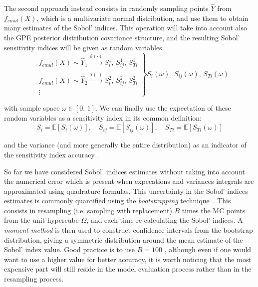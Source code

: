 \noindent
The second approach instead consists in randomly sampling points $\hat{Y}$ from $f_{emul}(X)$, which is a multivariate normal distribution, and use them to obtain many estimates of the Sobol' indices. This operation will take into account also the GPE posterior distribution covariance structure, and the resulting Sobol' sensitivity indices will be given as random variables
%
\begin{equation}\label{eq:emulpostsamplesgsa1}
    \left.
        \begin{array}{ll}
            & f_{emul}(X)\sim\hat{Y}_1\xrightarrow[]{\mathcal{S}(\cdot)} S_{i}^{1},\,S_{ij}^{1},\,S_{Ti}^{1} \\
            & f_{emul}(X)\sim\hat{Y}_2\xrightarrow[]{\mathcal{S}(\cdot)} S_{i}^{2},\,S_{ij}^{2},\,S_{Ti}^{2} \\
            & \vdots
        \end{array}
    \right\}S_i(\omega),\,S_{ij}(\omega),\,S_{Ti}(\omega)
\end{equation}

\noindent
with sample space $\omega\in [0,\,1]$. We can finally use the expectation of these random variables as a sensitivity index in its common definition:
%
\begin{equation}\label{eq:emulpostsamplesgsa2}
    S_{i} = \mathbb{E}[S_i(\omega)],\quad S_{ij} = \mathbb{E}[S_{ij}(\omega)],\quad S_{Ti} = \mathbb{E}[S_{Ti}(\omega)]
\end{equation}

\noindent
and the variance (and more generally the entire distribution) as an indicator of the sensitivity index accuracy .

\vspace{0.2cm}
So far we have considered Sobol' indices estimates without taking into account the numerical error which is present when expecations and variances integrals are approximated using quadrature formulas. This uncertainty in the Sobol' indices estimates is commonly quantified using the \textit{bootstrapping} technique~\cite{Archer:1997}. This consists in resampling (i.e. sampling with replacement) $B$ times the MC points from the unit hypercube $\Omega$, and each time re-calculating the Sobol' indices. A \textit{moment method} is then used to construct confidence intervals from the bootstrap distribution, giving a symmetric distribution around the mean estimate of the Sobol' index value. Good practice is to use $B=100$ , although even if one would want to use a higher value for better accuracy, it is worth noticing that the most expensive part will still reside in the model evaluation process rather than in the resampling process.

